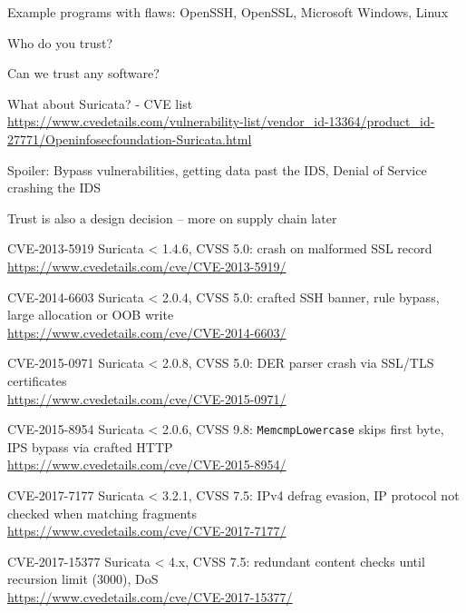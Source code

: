 \documentclass[Screen16to9,17pt]{foils}
\begin{document}

\begin{list2}
\item Example programs with flaws: OpenSSH, OpenSSL, Microsoft Windows, Linux
\item Who do you trust?
\item Can we trust any software?

\item What about Suricata? - CVE list\\
{\footnotesize\url{https://www.cvedetails.com/vulnerability-list/vendor_id-13364/product_id-27771/Openinfosecfoundation-Suricata.html}}
\item Spoiler: Bypass vulnerabilities, getting data past the IDS, Denial of Service crashing the IDS
\item Trust is also a design decision -- more on supply chain later
\end{list2}


\begin{list2}
\item CVE-2013-5919 Suricata < 1.4.6, CVSS 5.0: crash on malformed SSL record\\
      \url{https://www.cvedetails.com/cve/CVE-2013-5919/}
\item CVE-2014-6603 Suricata < 2.0.4, CVSS 5.0: crafted SSH banner, rule bypass,
      large allocation or OOB write\\
      \url{https://www.cvedetails.com/cve/CVE-2014-6603/}
\item CVE-2015-0971 Suricata < 2.0.8, CVSS 5.0: DER parser crash via
      SSL/TLS certificates\\
      \url{https://www.cvedetails.com/cve/CVE-2015-0971/}
\item CVE-2015-8954 Suricata < 2.0.6, CVSS 9.8: \verb+MemcmpLowercase+ skips
      first byte, IPS bypass via crafted HTTP\\
      \url{https://www.cvedetails.com/cve/CVE-2015-8954/}
\item CVE-2017-7177 Suricata < 3.2.1, CVSS 7.5: IPv4 defrag evasion,
      IP protocol not checked when matching fragments\\
      \url{https://www.cvedetails.com/cve/CVE-2017-7177/}
\item CVE-2017-15377 Suricata < 4.x, CVSS 7.5: redundant content checks
      until recursion limit (3000), DoS\\
      \url{https://www.cvedetails.com/cve/CVE-2017-15377/}
\end{list2}
\end{document}
